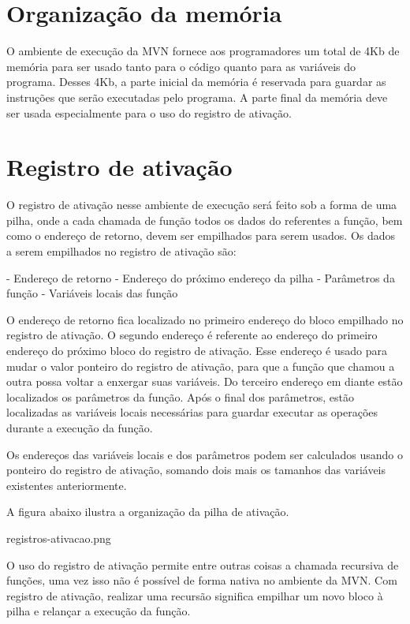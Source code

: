 
\section{Organização da memória}

O ambiente de execução da MVN fornece aos programadores um total de 4Kb de memória para ser usado tanto para o código quanto para as variáveis do programa. Desses 4Kb, a parte inicial da memória é reservada para guardar as instruções que serão executadas pelo programa. A parte final da memória deve ser usada especialmente para o uso do registro de ativação.

\section{Registro de ativação}

O registro de ativação nesse ambiente de execução será feito sob a forma de uma pilha, onde a cada chamada de função todos os dados do referentes a função, bem como o endereço de retorno, devem ser empilhados para serem usados. Os dados a serem empilhados no registro de ativação são:

- Endereço de retorno
- Endereço do próximo endereço da pilha
- Parâmetros da função
- Variáveis locais das função

O endereço de retorno fica localizado no primeiro endereço do bloco empilhado no registro de ativação. O segundo endereço é referente ao endereço do primeiro endereço do próximo bloco do registro de ativação. Esse endereço é usado para mudar o valor ponteiro do registro de ativação, para que a função que chamou a outra possa voltar a enxergar suas variáveis. Do terceiro endereço em diante estão localizados os parâmetros da função. Após o final dos parâmetros, estão localizadas as variáveis locais necessárias para guardar executar as operações durante a execução da função.

Os endereços das variáveis locais e dos parâmetros podem ser calculados usando o ponteiro do registro de ativação, somando dois mais os tamanhos das variáveis existentes anteriormente.

A figura abaixo ilustra a organização da pilha de ativação.

registros-ativacao.png

O uso do registro de ativação permite entre outras coisas a chamada recursiva de funções, uma vez isso não é possível de forma nativa no ambiente da MVN. Com registro de ativação, realizar uma recursão significa empilhar um novo bloco à pilha e relançar a execução da função.
